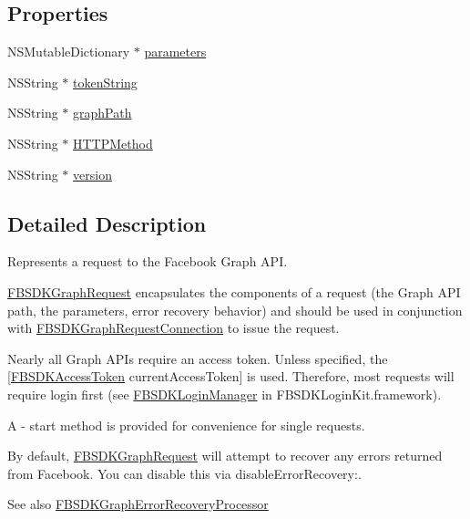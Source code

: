 \subsection*{Properties}
\begin{DoxyCompactItemize}
\item 
N\+S\+Mutable\+Dictionary $\ast$ \hyperlink{interface_f_b_s_d_k_graph_request_af769aa811f0eb9f2f1e56b4ac6e323e1}{parameters}
\item 
N\+S\+String $\ast$ \hyperlink{interface_f_b_s_d_k_graph_request_a96c19ad8e7bb79261467b812a70ef2c9}{token\+String}
\item 
N\+S\+String $\ast$ \hyperlink{interface_f_b_s_d_k_graph_request_a10e91143d0aa1301a527f43c60c53535}{graph\+Path}
\item 
N\+S\+String $\ast$ \hyperlink{interface_f_b_s_d_k_graph_request_a8a290580d36baf0de7aacf859a13902c}{H\+T\+T\+P\+Method}
\item 
N\+S\+String $\ast$ \hyperlink{interface_f_b_s_d_k_graph_request_a651d49b68ef87318eddd8d794843d165}{version}
\end{DoxyCompactItemize}


\subsection{Detailed Description}
Represents a request to the Facebook Graph A\+P\+I.

{\ttfamily \hyperlink{interface_f_b_s_d_k_graph_request}{F\+B\+S\+D\+K\+Graph\+Request}} encapsulates the components of a request (the Graph A\+P\+I path, the parameters, error recovery behavior) and should be used in conjunction with {\ttfamily \hyperlink{interface_f_b_s_d_k_graph_request_connection}{F\+B\+S\+D\+K\+Graph\+Request\+Connection}} to issue the request.

Nearly all Graph A\+P\+Is require an access token. Unless specified, the {\ttfamily \mbox{[}\hyperlink{interface_f_b_s_d_k_access_token}{F\+B\+S\+D\+K\+Access\+Token} current\+Access\+Token\mbox{]}} is used. Therefore, most requests will require login first (see {\ttfamily \hyperlink{interface_f_b_s_d_k_login_manager}{F\+B\+S\+D\+K\+Login\+Manager}} in F\+B\+S\+D\+K\+Login\+Kit.\+framework).

A {\ttfamily -\/ start} method is provided for convenience for single requests.

By default, \hyperlink{interface_f_b_s_d_k_graph_request}{F\+B\+S\+D\+K\+Graph\+Request} will attempt to recover any errors returned from Facebook. You can disable this via {\ttfamily disable\+Error\+Recovery\+:}. \begin{DoxySeeAlso}{See also}
\hyperlink{interface_f_b_s_d_k_graph_error_recovery_processor}{F\+B\+S\+D\+K\+Graph\+Error\+Recovery\+Processor} 
\end{DoxySeeAlso}


